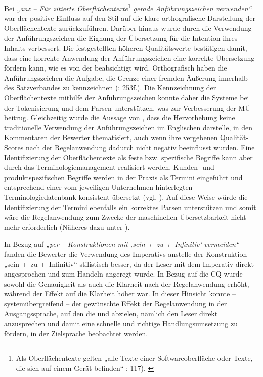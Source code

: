 Bei \textit{„anz -- Für zitierte Oberflächentexte}\footnote{{{{Als} }}\textrm{Oberflächentexte}{{{ gelten „alle Texte einer Softwareoberfläche oder Texte, die sich auf einem Gerät befinden“ \citealt{tekom2013}: 117).} }}} \textit{gerade Anführungszeichen verwenden“} war der positive Einfluss auf den Stil auf die klare orthografische Darstellung der Oberflächentexte zurückzuführen. Darüber hinaus wurde durch die Verwendung der Anführungszeichen die Eignung der Übersetzung für die Intention ihres Inhalts verbessert. Die festgestellten höheren Qualitätswerte bestätigen damit, dass eine korrekte Anwendung der Anführungszeichen eine korrekte Übersetzung fördern kann, wie es von der \citep[118]{tekom2013} beabsichtigt wird. Orthografisch haben die Anführungszeichen die Aufgabe, die Grenze einer fremden Äußerung innerhalb des Satzverbandes zu kennzeichnen (\citealt{Nerius2007}: 253f.). Die Kennzeichnung der Oberflächentexte mithilfe der Anführungszeichen konnte daher die Systeme bei der Tokenisierung und dem Parsen unterstützen, was zur Verbesserung der MÜ beitrug. Gleichzeitig wurde die Aussage von \citet{McMurrey2006}, dass die Hervorhebung keine traditionelle Verwendung der Anführungszeichen im Englischen darstelle, in den Kommentaren der Bewerter thematisiert, auch wenn ihre vergebenen Qualität-Scores nach der Regelanwendung dadurch nicht negativ beeinflusst wurden. Eine Identifizierung der Oberflächentexte als feste bzw. spezifische Begriffe kann aber durch das Terminologiemanagement realisiert werden. Kunden- und produktspezifischen Begriffe werden in der Praxis als Termini eingeführt und entsprechend einer vom jeweiligen Unternehmen hinterlegten Terminologiedatenbank konsistent übersetzt (vgl. \citealt{Volk2018}). Auf diese Weise würde die Identifizierung der Termini ebenfalls ein korrektes Parsen unterstützen und somit wäre die Regelanwendung zum Zwecke der maschinellen Übersetzbarkeit nicht mehr erforderlich (Näheres dazu unter ).

In Bezug auf \textit{„per -- Konstruktionen mit ‚sein +~zu +~Infinitiv‘ vermeiden“} fanden die Bewerter die Verwendung des Imperativs anstelle der Konstruktion „sein +~zu +~Infinitiv“ stilistisch besser, da der Leser mit dem Imperativ direkt angesprochen und zum Handeln angeregt wurde. In Bezug auf die CQ wurde sowohl die Genauigkeit als auch die Klarheit nach der Regelanwendung erhöht, während der Effekt auf die Klarheit höher war. In dieser Hinsicht konnte -- systemübergreifend -- der gewünschte Effekt der Regelanwendung in der Ausgangssprache, auf den die \citet[86]{tekom2013} und \citet{Congree2018} abzielen, nämlich den Leser direkt anzusprechen und damit eine schnelle und richtige Handlungsumsetzung zu fördern, in der Zielsprache beobachtet werden.

